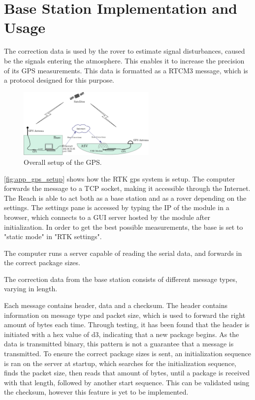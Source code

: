 \section*{Base Station Implementation and Usage}
The correction data is used by the rover to estimate signal disturbances, caused be the signals entering the atmosphere. 
This enables it to increase the precision of its GPS measurements. This data is formatted as a RTCM3 message, which is a protocol designed for this purpose.
\begin{figure}[H]
	\includegraphics[width=0.6\textwidth]{figures/comunicationSetup.pdf}
	\caption{Overall setup of the GPS.}
	\label{fig:app_gps_setup}
\end{figure}
\autoref{fig:app_gps_setup} shows how the RTK gps system is setup. 
The computer forwards the message to a TCP socket, making it accessible through the Internet. 
The Reach is able to act both as a base station and as a rover depending on the settings.
The settings pane is accessed by typing the IP of the module in a browser, which connects to a GUI server hosted by the module after initialization.
In order to get the best possible measurements, the base is set to "static mode" in "RTK settings".



The computer runs a server capable of reading the serial data, and forwards in the correct package sizes.

The correction data from the base station consists of different message types, varying in length.

Each message contains header, data and a checksum. The header contains information on message type and packet size, which is used to forward the right amount of bytes each time.
Through testing, it has been found that the header is initiated with a hex value of d3, indicating that a new package begins. As the data is transmitted binary, this pattern is not a guarantee that a message is transmitted. 
To ensure the correct package sizes is sent, an initialization sequence is ran on the server at startup, which searches for the initialization sequence, finds the packet size, then reads that amount of bytes, until a package is received with that length, followed by another start sequence.
This can be validated using the checksum, however this feature is yet to be implemented. 

